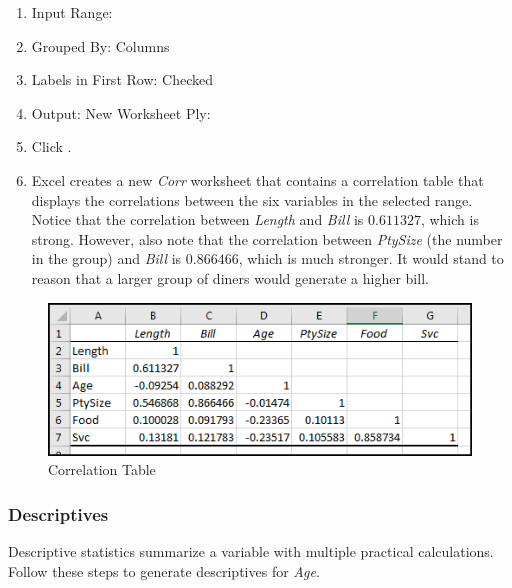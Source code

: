 \begin{enumbox}
\begin{enumerate}
		\item Input Range: 
		\item Grouped By: Columns
		\item Labels in First Row: Checked
		\item Output: New Worksheet Ply: 
		\item Click .
		\item Excel creates a new \textit{Corr} worksheet that contains a correlation table that displays the correlations between the six variables in the selected range. Notice that the correlation between \textit{Length} and \textit{Bill} is $ 0.611327 $, which is strong. However, also note that the correlation between \textit{PtySize} (the number in the group) and \textit{Bill} is $ 0.866466 $, which is much stronger. It would stand to reason that a larger group of diners would generate a higher bill.
	\end{enumerate}
\end{enumbox}

\begin{figure}[H]
	\centering
	\includegraphics[width=\maxwidth{.95\linewidth}]{gfx/ch09_fig56}
	\caption{Correlation Table}
	\label{09:fig56}
\end{figure}

\subsubsection{Descriptives}

Descriptive statistics summarize a variable with multiple practical calculations. Follow these steps to generate descriptives for \textit{Age}.

